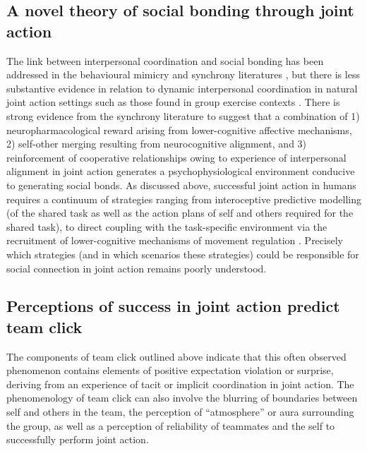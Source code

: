 \begin{CJK}{UTF8}{gbsn}
\section{A novel theory of social bonding through joint action\label{sect:novelTheory}}

The link between interpersonal coordination and social bonding has been addressed in the behavioural mimicry and synchrony literatures \citep[e.g.,][]{Wheatley2012,Launay2016,Mogan2017}, but there is less substantive evidence in relation to dynamic interpersonal coordination in natural joint action settings such as those found in group exercise contexts \citep{Marsh2009,Miles2009,Lumsden2012}.  There is strong evidence from the synchrony literature to suggest that a combination of 1) neuropharmacological reward arising from lower-cognitive affective mechanisms, 2) self-other merging resulting from neurocognitive alignment, and 3) reinforcement of cooperative relationships owing to experience of interpersonal alignment in joint action generates a psychophysiological environment conducive to generating social bonds.  As discussed above, successful joint action in humans requires a continuum of strategies ranging from interoceptive predictive modelling (of the shared task as well as the action plans of self and others required for the shared task), to direct coupling with the task-specific environment via the recruitment of lower-cognitive mechanisms of movement regulation \citep[e.g., proprioceptive mechanisms of balance and orientation][]{Semin2008} .  Precisely which strategies (and in which scenarios these strategies) could be responsible for social connection in joint action remains poorly understood.

\subsection{Perceptions of success in joint action predict team click\label{sect:JASuccessTeamClick}}

The components of team click outlined above indicate that this often observed phenomenon contains elements of positive expectation violation or surprise, deriving from an experience of tacit or implicit coordination in joint action.  The phenomenology of team click can also involve the blurring of boundaries between self and others in the team, the perception of ``atmosphere'' or aura surrounding the group, as well as a perception of reliability of teammates and the self to successfully perform joint action.


\end{CJK}
